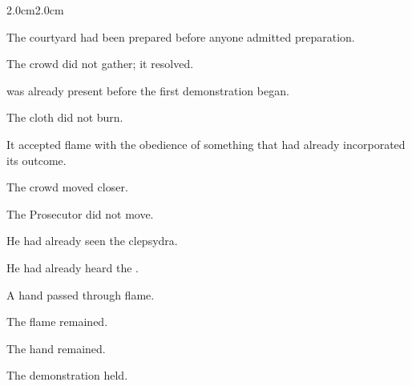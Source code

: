 \begin{adjustwidth}{2.0cm}{2.0cm}

The courtyard had been prepared before anyone admitted preparation.

\medskip

The crowd did not gather; it resolved.

\medskip

 was already present before the first demonstration began.

\medskip


\medskip


\medskip


\medskip

The cloth did not burn.

\medskip

It accepted flame with the obedience of something that had already incorporated
its outcome.

\medskip

The crowd moved closer.

\medskip


\medskip

The Prosecutor did not move.

\medskip

He had already seen the clepsydra.

\medskip

He had already heard the .

\medskip


\medskip


\medskip

A hand passed through flame.

\medskip

The flame remained.

\medskip

The hand remained.

\medskip

The demonstration held.

\medskip


\end{adjustwidth}
